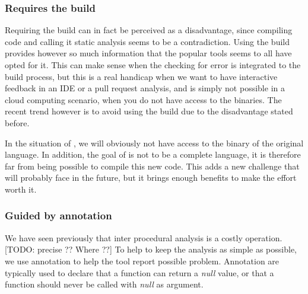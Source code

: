\subsubsection{Requires the build}
\label{subsubsec:require_build}

Requiring the build can in fact be perceived as a disadvantage, since compiling code and calling it static analysis seems to be a contradiction. 
Using the build provides however so much information that the popular tools seems to all have opted for it. 
This can make sense when the checking for error is integrated to the build process, but this is a real handicap when we want to have interactive feedback in an IDE or a pull request analysis, and is simply not possible in a cloud computing scenario, when you do not have access to the binaries. 
The recent trend however is to avoid using the build due to the disadvantage stated before.

In the situation of \slang{}, we will obviously not have access to the binary of the original language. 
In addition, the goal of \slang{} is not to be a complete language, it is therefore far from being possible to compile this new code. 
This adds a new challenge that \slang{} will probably face in the future, but it brings enough benefits to make the effort worth it.

\subsubsection{Guided by annotation}
\label{subsubsec:guided_by_annotation}

We have seen previously that inter procedural analysis is a costly operation.
[TODO: precise ?? Where ??] 
To help to keep the analysis as simple as possible, we use annotation to help the tool report possible problem. Annotation are typically used to declare that a function can return a \emph{null} value, or that a function should never be called with \emph{null} as argument.



